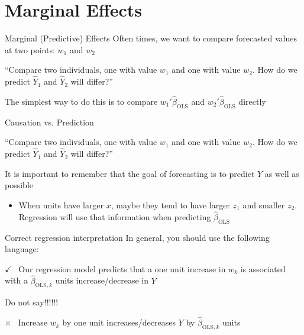 \documentclass[aspectratio=169,t,11pt,table]{beamer}
\begin{document}
\section{Marginal Effects}

\begin{frame}{Marginal (Predictive) Effects}
  Often times, we want to compare forecasted values at two points: $w_1$ and $w_2$

  \begin{tcolorbox}[boxrule = 0pt, frame hidden, sharp corners, enhanced, borderline west = {2pt}{0pt}{blue}, interior hidden]
    ``Compare two individuals, one with value $w_1$ and one with value $w_2$. How do we predict $\hat{Y}_1$ and $\hat{Y}_2$ will differ?''
  \end{tcolorbox}

  The simplest way to do this is to compare $w_1' \hat{\beta}_{\text{OLS}}$ and $w_2' \hat{\beta}_{\text{OLS}}$ directly
\end{frame}

\begin{frame}{Causation vs. Prediction}
  \begin{tcolorbox}[boxrule = 0pt, frame hidden, sharp corners, enhanced, borderline west = {2pt}{0pt}{blue}, interior hidden]
    ``Compare two individuals, one with value $w_1$ and one with value $w_2$. How do we predict $\hat{Y}_1$ and $\hat{Y}_2$ will differ?''
  \end{tcolorbox}
  
  It is important to remember that the goal of forecasting is to predict $Y$ as well as possible
  \begin{itemize}
    \item When units have larger $x$, maybe they tend to have larger $z_1$ and smaller $z_2$. Regression will use that information when predicting $\hat{\beta}_{\text{OLS}}$
  \end{itemize}
\end{frame}

\begin{frame}{Correct regression interpretation}
  In general, you should use the following language:
  
  \begin{tcolorbox}[boxrule = 0pt, frame hidden, sharp corners, enhanced, borderline west = {4pt}{0pt}{green}, interior hidden]
    {\color{green}\Large $\checkmark$\ } Our regression model predicts that a one unit increase in $w_k$ is associated with a $\hat{\beta}_{\text{OLS},k}$ units increase/decrease in $Y$
  \end{tcolorbox}

  \bigskip
  Do not say!!!!!! 
  \begin{tcolorbox}[boxrule = 0pt, frame hidden, sharp corners, enhanced, borderline west = {4pt}{0pt}{red}, interior hidden]
   {\color{red}\Large $\times$\ } Increase $w_k$ by one unit increases/decreases $Y$ by $\hat{\beta}_{\text{OLS},k}$ units
  \end{tcolorbox}
\end{frame}
\end{document}
